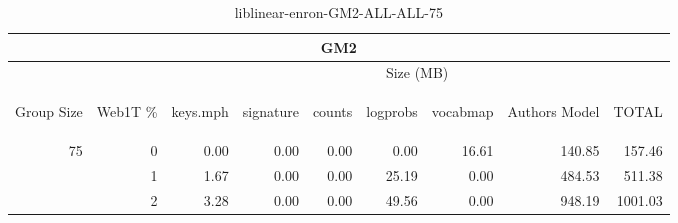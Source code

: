 \begin{center}
\begin{table}[htbp]
\begin{tabular}{ | r | r | r | r | r | r | r | r | r |}
\hline
\multicolumn{9}{|c|}{GM2}\\
\hline
 & & \multicolumn{7}{|c|}{Size (MB)}\\ \cline{3-9}
\begin{sideways}Group Size\end{sideways} & \begin{sideways}Web1T \% \end{sideways} & \begin{sideways}keys.mph\end{sideways} & \begin{sideways}signature\end{sideways} & \begin{sideways}counts\end{sideways} & \begin{sideways}logprobs\end{sideways} & \begin{sideways}vocabmap\end{sideways} & \begin{sideways}Authors Model \end{sideways} & \begin{sideways}TOTAL\end{sideways}\\
\hline
\multirow{2}{*}{75}
 & 0 & 0.00 & 0.00 & 0.00 & 0.00 & 16.61 & 140.85 & 157.46\\ \cline{2-9}
 & 1 & 1.67 & 0.00 & 0.00 & 25.19 & 0.00 & 484.53 & 511.38\\ \cline{2-9}
 & 2 & 3.28 & 0.00 & 0.00 & 49.56 & 0.00 & 948.19 & 1001.03\\ \cline{2-9}
\hline
\end{tabular}
\caption{liblinear-enron-GM2-ALL-ALL-75}
\label{table:liblinear-enron-GM2-ALL-ALL-75}
\end{table}
\end{center}

